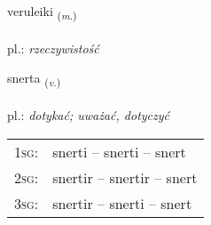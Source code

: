 \documentclass[frontgrid, backgrid]{flacards}\usepackage[]{graphicx}\usepackage[]{xcolor}
\begin{document}
\renewcommand{\flhead}{\vskip5pt \fboxsep=0pt {\small\bfseries\footnotesize Nafnorð | Noun}}
\renewcommand{\fcfoot}{\vskip5pt \fboxsep=0pt \hspace{2pt}{\small\bfseries\footnotesize 2K}}

\renewcommand{\blhead}{\vskip5pt {\small\bfseries\footnotesize Nafnorð | Noun }}
\renewcommand{\bcfoot}{\vskip5pt \hspace{2pt}{\small\bfseries\footnotesize 2K}}


{veruleiki \small{\textsubscript{(\textit{m.})}} \\[1ex] %
\textphonetic{[vɛːrʏleicɪ]} \\
pl.: \emph{rzeczywistość} \\  [2ex]
\renewcommand*{\arraystretch}{0.8}
}

\renewcommand{\flhead}{\vskip5pt \fboxsep=0pt {\small\bfseries\footnotesize Sagnorð | Verb}}
\renewcommand{\fcfoot}{\vskip5pt \fboxsep=0pt \hspace{2pt}{\small\bfseries\footnotesize 2K}}

\renewcommand{\blhead}{\vskip5pt {\small\bfseries\footnotesize Sagnorð | Verb }}
\renewcommand{\bcfoot}{\vskip5pt \hspace{2pt}{\small\bfseries\footnotesize 2K}}


{snerta \small{\textsubscript{(\textit{v.})}} \\[1ex] %
\textphonetic{[stnɛr̥ta]} \\
pl.: \emph{dotykać; uważać, dotyczyć} \\  [2ex]
\renewcommand*{\arraystretch}{0.8}
\begin{tabular}{p{1cm}l}
\textsc{1sg}: & snerti -- snerti -- snert \\ 
\textsc{2sg}: & snertir -- snertir -- snert \\ 
\textsc{3sg}: & snertir -- snerti -- snert \\ 
\end{tabular}
}
\end{document}
